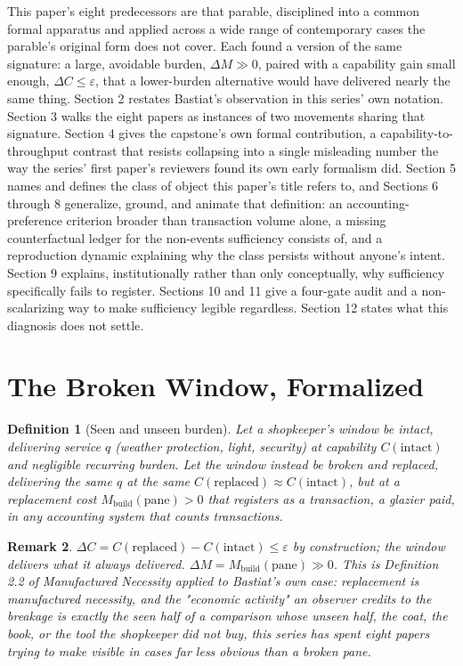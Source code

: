 \documentclass[11pt]{article}
\newtheorem{definition}{Definition}[section]
\newtheorem{remark}[definition]{Remark}
\begin{document}
This paper's eight predecessors are that parable, disciplined into a common formal apparatus and applied across a wide range of contemporary cases the parable's original form does not cover. Each found a version of the same signature: a large, avoidable burden, $\Delta M \gg 0$, paired with a capability gain small enough, $\Delta C \leq \varepsilon$, that a lower-burden alternative would have delivered nearly the same thing. Section 2 restates Bastiat's observation in this series' own notation. Section 3 walks the eight papers as instances of two movements sharing that signature. Section 4 gives the capstone's own formal contribution, a capability-to-throughput contrast that resists collapsing into a single misleading number the way the series' first paper's reviewers found its own early formalism did. Section 5 names and defines the class of object this paper's title refers to, and Sections 6 through 8 generalize, ground, and animate that definition: an accounting-preference criterion broader than transaction volume alone, a missing counterfactual ledger for the non-events sufficiency consists of, and a reproduction dynamic explaining why the class persists without anyone's intent. Section 9 explains, institutionally rather than only conceptually, why sufficiency specifically fails to register. Sections 10 and 11 give a four-gate audit and a non-scalarizing way to make sufficiency legible regardless. Section 12 states what this diagnosis does not settle.

\section{The Broken Window, Formalized}

\begin{definition}[Seen and unseen burden]
Let a shopkeeper's window be intact, delivering service $q$ (weather protection, light, security) at capability $C(\text{intact})$ and negligible recurring burden. Let the window instead be broken and replaced, delivering the same $q$ at the same $C(\text{replaced}) \approx C(\text{intact})$, but at a replacement cost $M_{\text{build}}(\text{pane}) > 0$ that registers as a transaction, a glazier paid, in any accounting system that counts transactions.
\end{definition}

\begin{remark}
$\Delta C = C(\text{replaced}) - C(\text{intact}) \leq \varepsilon$ by construction; the window delivers what it always delivered. $\Delta M = M_{\text{build}}(\text{pane}) \gg 0$. This is Definition 2.2 of \emph{Manufactured Necessity} applied to Bastiat's own case: replacement is manufactured necessity, and the "economic activity" an observer credits to the breakage is exactly the seen half of a comparison whose unseen half, the coat, the book, or the tool the shopkeeper did not buy, this series has spent eight papers trying to make visible in cases far less obvious than a broken pane.
\end{remark}
\end{document}
